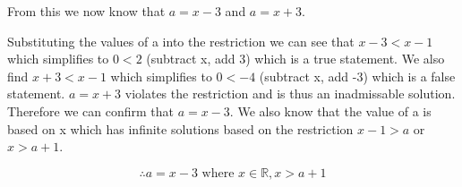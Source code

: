 \documentclass[12pt]{book}
\begin{document}
\begin{enumerate}
From this we now know that $a=x-3$ and $a=x+3$. 

Substituting the values of a into the 
restriction we can see that $x-3<x-1$ which simplifies to $0<2$ (subtract x, add 3) which is a true statement. 
We also find $x+3<x-1$ which simplifies to $0<-4$ (subtract x, add -3) which is a false statement. $a=x+3$ 
violates the restriction and is thus an inadmissable solution. Therefore we can confirm that $a=x-3$.
We also know that the value of a is based on x which has infinite solutions based on the 
restriction $x-1 > a$ or $x > a+1$.

$$\therefore a = x-3 \text{ where } x \in \mathbb{R}, x>a+1 $$

\newpage


\end{enumerate}
\end{document}
